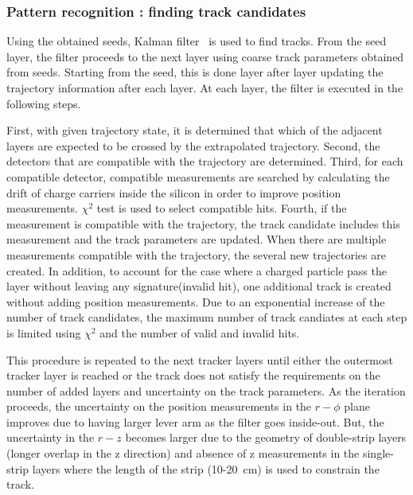 \subsubsection{Pattern recognition : finding track candidates}

Using the obtained seeds, Kalman filter~\cite{Fruhwirth1996189} is used to find tracks. 
From the seed layer, the filter proceeds to the next layer using coarse 
track parameters obtained from seeds. Starting from the seed, this is done 
layer after layer updating the trajectory information after each layer. 
At each layer, the filter is executed in the following steps. 

First, with given trajectory state, 
it is determined that which of the adjacent layers are expected 
to be crossed by the extrapolated trajectory. Second, the detectors 
that are compatible with the trajectory are determined. Third, 
for each compatible detector, compatible measurements are searched 
by calculating the drift of charge carriers inside the silicon 
in order to improve position measurements. $\chi^2$ test is used 
to select compatible hits. Fourth, if the measurement is compatible 
with the trajectory, the track candidate includes this measurement 
and the track parameters are updated. When there are multiple measurements
compatible with the trajectory, the several new trajectories are 
created. In addition, to account for the case where a charged particle 
pass the layer without leaving any signature(invalid hit), one additional track is created
without adding position measurements.  
Due to an exponential increase of the number of track candidates, 
the maximum number of track candiates at each step is limited 
using $\chi^2$ and the number of valid and invalid hits. 

This procedure is repeated to the next tracker layers until either the 
outermost tracker layer is reached or the track does not satisfy the requirements
on the number of added layers and uncertainty on the track parameters.
As the iteration proceeds, the uncertainty on the position measurements 
in the $r-\phi$ plane improves due to having larger lever arm 
as the filter goes inside-out. But, the uncertainty in the $r-z$ 
becomes larger due to the geometry of double-strip layers
(longer overlap in the z direction) and absence of z measurements 
in the single-strip layers where the length of the strip (10-20~cm) is 
used to constrain the track. 

